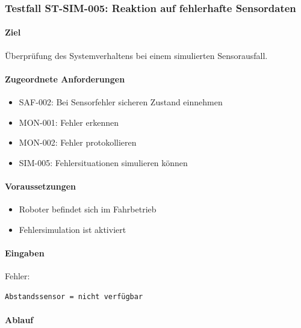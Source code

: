 \documentclass[
  a4paper,
  12pt,
  DIV=12,        %
  parskip=half,  %
  headings=small %
]{scrartcl}
\theoremstyle{definition}
\providecommand{\tightlist}{%
  \setlength{\itemsep}{0pt}\setlength{\parskip}{0pt}}
\theoremstyle{definition}
\begin{document}
\subsubsection{Testfall ST-SIM-005: Reaktion auf fehlerhafte
Sensordaten}\label{testfall-st-sim-005-reaktion-auf-fehlerhafte-sensordaten}

\paragraph{Ziel}\label{ziel-20}

Überprüfung des Systemverhaltens bei einem simulierten Sensorausfall.

\paragraph{Zugeordnete
Anforderungen}\label{zugeordnete-anforderungen-20}

\begin{itemize}
\tightlist
\item
  SAF-002: Bei Sensorfehler sicheren Zustand einnehmen
\item
  MON-001: Fehler erkennen
\item
  MON-002: Fehler protokollieren
\item
  SIM-005: Fehlersituationen simulieren können
\end{itemize}

\paragraph{Voraussetzungen}\label{voraussetzungen-20}

\begin{itemize}
\tightlist
\item
  Roboter befindet sich im Fahrbetrieb
\item
  Fehlersimulation ist aktiviert
\end{itemize}

\paragraph{Eingaben}\label{eingaben-17}

Fehler:

\begin{verbatim}
Abstandssensor = nicht verfügbar
\end{verbatim}

\paragraph{Ablauf}\label{ablauf-20}
\end{document}
